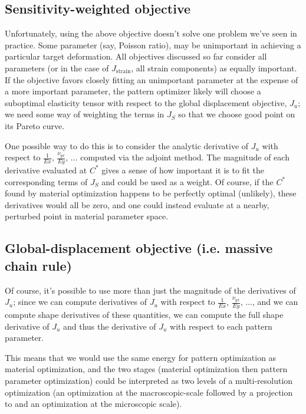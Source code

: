 \documentclass[10pt]{article}
\begin{document}
\subsection{Sensitivity-weighted objective}
\label{sec:sensitivity_weight}
Unfortunately, using the above objective doesn't solve one problem we've seen in
practice. Some parameter (say, Poisson ratio), may be unimportant in
achieving a particular target deformation. All objectives discussed so far consider all
parameters (or in the case of $J_\text{strain}$, all strain components)
as equally important. If the objective favors closely fitting an unimportant
parameter at the expense of a more important parameter, the pattern optimizer
likely will choose a suboptimal elasticity tensor with respect to the global
displacement objective, $J_u$; we need some way of weighting the terms in $J_S$ so
that we choose good point on its Pareto curve.

One possible way to do this is to consider the analytic derivative of $J_u$
with respect to $\frac{1}{Ex}$, $\frac{\nu_{yx}}{Ey}$, $\dots$ computed via the
adjoint method. The magnitude of each derivative evaluated at $C^*$ gives a sense
of how important it is to fit the corresponding terms of $J_S$ and could be used as a
weight. Of course, if the $C^*$ found by material optimization happens to be
perfectly optimal (unlikely), these derivatives would all be zero, and one could
instead evaluate at a nearby, perturbed point in material parameter space.

\subsection{Global-displacement objective (i.e. massive chain rule)}
\label{sec:chain_rule}
Of course, it's possible to use more than just the magnitude of the derivatives
of $J_u$; since we can compute derivatives of $J_u$ with respect to
$\frac{1}{Ex}$, $\frac{\nu_{yx}}{Ey}$, $\dots$, and we can compute shape
derivatives of these quantities, we can compute the full shape derivative of
$J_u$ and thus the derivative of $J_u$ with respect to each pattern parameter.

This means that we would use the same energy for pattern optimization as material
optimization, and the two stages (material optimization then pattern parameter
optimization) could be interpreted as two levels of a multi-resolution optimization
(an optimization at the macroscopic-scale followed by a projection to and an
optimization at the microscopic scale).
\end{document}
